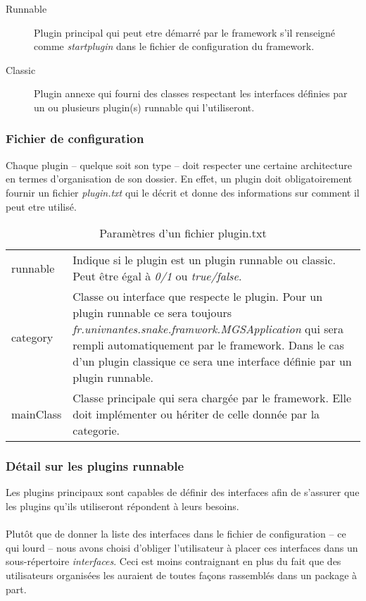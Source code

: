 \documentclass[12pt,a4paper]{article}
\begin{document}
\begin{description}
	\item[Runnable] Plugin principal qui peut etre démarré par le framework s'il 
	renseigné comme \emph{startplugin} dans le fichier de configuration du 
	framework.
	
	\item[Classic] Plugin annexe qui fourni des classes respectant les interfaces 
	définies par un ou plusieurs plugin(s) runnable qui l'utiliseront.
\end{description}

\subsubsection{Fichier de configuration}
Chaque plugin -- quelque soit son type -- doit respecter une certaine architecture 
en termes d'organisation de son dossier. En effet, un plugin doit obligatoirement 
fournir un fichier \emph{plugin.txt} qui le décrit et donne des informations sur 
comment il peut etre utilisé.

\begin{table}[h]\label{tab:plugintxt}
\centering
	\begin{tabular}{lp{10cm}}
		runnable & Indique si le plugin est un plugin runnable ou classic. 
		Peut être égal à \emph{0/1} ou \emph{true/false}.\\				
		
		category & Classe ou interface que respecte le plugin. Pour un plugin 
		runnable ce sera toujours \emph{fr.univnantes.snake.framwork.MGSApplication} 
		qui sera rempli automatiquement par le framework. Dans le cas d'un plugin 
		classique ce sera une interface définie par un plugin runnable.\\
		
		mainClass & Classe principale qui sera chargée par le framework. 
		Elle doit implémenter ou hériter de celle donnée par la categorie.\\
	\end{tabular}	
\caption{Paramètres d'un fichier plugin.txt}
\end{table}

\subsubsection{Détail sur les plugins runnable}\label{sss:DetailsRunnable}
Les plugins principaux sont capables de définir des interfaces afin de s'assurer 
que les plugins qu'ils utiliseront répondent à leurs besoins.
\\\\
Plutôt que de donner la liste des interfaces dans le fichier de configuration -- 
ce qui lourd -- nous avons choisi d'obliger l'utilisateur à placer ces interfaces 
dans un sous-répertoire \emph{interfaces}. Ceci est moins contraignant en plus du 
fait que des utilisateurs organisées les auraient de toutes façons rassemblés 
dans un package à part.
\end{document}
